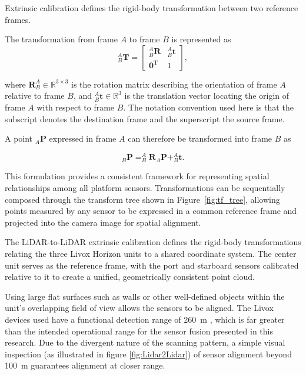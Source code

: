 \documentclass[../main.tex]{subfiles}
\begin{document}
Extrinsic calibration defines the rigid-body transformation between two reference frames.  

The transformation from frame $A$ to frame $B$ is represented as
\begin{equation}
    _{B}^{A}\mathbf{T} =
    \begin{bmatrix}
        _{B}^{A}\mathbf{R} & _{B}^{A}\mathbf{t} \\
        \mathbf{0}^\mathrm{T} & 1
    \end{bmatrix},
\end{equation}

where $\mathbf{R}_{B}^{A} \in \mathbb{R}^{3\times3}$ is the rotation matrix describing the orientation of frame $A$ relative to frame $B$, and $_{B}^{A}\mathbf{t} \in \mathbb{R}^{3}$ is the translation vector locating the origin of frame $A$ with respect to frame $B$.  
The notation convention used here is that the subscript denotes the destination frame and the superscript the source frame.

A point $_{A}\mathbf{P}$ expressed in frame $A$ can therefore be transformed into frame $B$ as

\begin{equation}
    _{B}\mathbf{P} =
    _{B}^{A}\mathbf{R} _{A}\mathbf{P} + _{B}^{A}\mathbf{t}.
\end{equation}

This formulation provides a consistent framework for representing spatial relationships among all platform sensors.  
Transformations can be sequentially composed through the transform tree shown in Figure~\ref{fig:tf_tree}, allowing points measured by any sensor to be expressed in a common reference frame and projected into the camera image for spatial alignment.

The \ac{LiDAR}-to-\ac{LiDAR} extrinsic calibration defines the rigid-body transformations relating the three Livox Horizon units to a shared coordinate system.  
The center unit serves as the reference frame, with the port and starboard sensors calibrated relative to it to create a unified, geometrically consistent point cloud.

Using large flat surfaces such as walls or other well-defined objects within the unit's overlapping field of view allows the sensors to be aligned.
The Livox devices used have a functional detection range of 260~m \cite{livox_manual}, which is far greater than the intended operational range for the sensor fusion presented in this research. 
Due to the divergent nature of the scanning pattern, a simple visual inspection  (as illustrated in figure \ref{fig:Lidar2Lidar}) of sensor alignment beyond 100~m guarantees alignment at closer range. 
\end{document}
